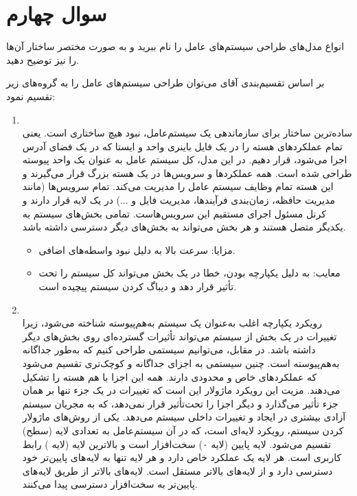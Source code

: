 \section{سوال چهارم}


انواع مدل‌های طراحی سیستم‌های عامل را نام ببرید و به صورت مختصر ساختار آن‌ها را نیز توضیح دهید.

\begin{qsolve}
	
	بر اساس تقسیم‌بندی آقای \lr{} می‌توان طراحی سیستم‌های عامل را به گروه‌های زیر تقسیم نمود:
	
	\begin{enumerate}
		\item 
		\\
		ساده‌ترین ساختار برای سازماندهی یک سیستم‌عامل، نبود هیچ ساختاری است. یعنی تمام عملکردهای هسته را در یک فایل باینری واحد و ایستا که در یک فضای آدرس اجرا می‌شود، قرار دهیم.
		در این مدل، کل سیستم عامل به عنوان یک واحد پیوسته طراحی شده است. همه عملکردها و سرویس‌ها در یک هسته بزرگ قرار می‌گیرند و این هسته تمام وظایف سیستم عامل را مدیریت می‌کند.
		تمام سرویس‌ها (مانند مدیریت حافظه، زمان‌بندی فرآیندها، مدیریت فایل و ...) در یک لایه قرار دارند و کرنل مسئول اجرای مستقیم این سرویس‌هاست. تمامی بخش‌های سیستم به یکدیگر متصل هستند و هر بخش می‌تواند به بخش‌های دیگر دسترسی داشته باشد.
		
		\begin{itemize}
			\item
			مزایا: سرعت بالا به دلیل نبود واسطه‌های اضافی.
			
			\item 
			معایب: به دلیل یکپارچه بودن، خطا در یک بخش می‌تواند کل سیستم را تحت تأثیر قرار دهد و دیباگ کردن سیستم پیچیده است.
		\end{itemize}
		
		
		
		
		
		
		\item 
		\\
		رویکرد یکپارچه اغلب به‌عنوان یک سیستم به‌هم‌پیوسته شناخته می‌شود، زیرا تغییرات در یک بخش از سیستم می‌تواند تأثیرات گسترده‌ای روی بخش‌های دیگر داشته باشد. در مقابل، می‌توانیم سیستمی طراحی کنیم که به‌طور جداگانه به‌هم‌پیوسته است. چنین سیستمی به اجزای جداگانه و کوچک‌تری تقسیم می‌شود که عملکردهای خاص و محدودی دارند. همه این اجزا با هم هسته را تشکیل می‌دهند. مزیت این رویکرد ماژولار این است که تغییرات در یک جزء تنها بر همان جزء تأثیر می‌گذارد و دیگر اجزا را تحت‌تأثیر قرار نمی‌دهد، که به مجریان سیستم آزادی بیشتری در ایجاد و تغییرات داخلی سیستم می‌دهد. یکی از روش‌های ماژولار کردن سیستم، رویکرد لایه‌ای است، که در آن سیستم‌عامل به تعدادی لایه (سطح) تقسیم می‌شود. لایه پایین (لایه ۰) سخت‌افزار است و بالاترین لایه (لایه ) رابط کاربری است. هر لایه یک عملکرد خاص دارد و هر لایه تنها به لایه‌های پایین‌تر خود دسترسی دارد و از لایه‌های بالاتر مستقل است. لایه‌های بالاتر از طریق لایه‌های پایین‌تر به سخت‌افزار دسترسی پیدا می‌کنند.
		

\end{enumerate}
\end{qsolve}
